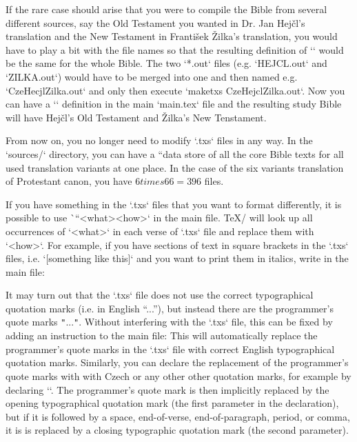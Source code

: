 {If the rare case should arise that you were to compile the Bible from several different sources, say the Old Testament you wanted in Dr. Jan Hejčl's translation and the New Testament in František Žilka's translation, you would have to play a bit with the file names so that the resulting definition of `\tmark` would be the same for the whole Bible. The two `*.out` files (e.g. `HEJCL.out` and `ZILKA.out`) would have to be merged into one and then named e.g. `CzeHecjlZilka.out` and  only then execute `maketxs CzeHejclZilka.out`.  Now you can have a `\def\tmark{HejclZilka}` definition in the main `main.tex` file and 
the resulting study Bible will have Hejčl's Old Testament and Žilka's New Tenstament.




From now on, you no longer need to modify  `.txs` files in any way.
In the `sources/` directory, you can have a “data store of all the core Bible texts for all used translation variants at one place. In the case of the six variants
translation of Protestant canon, you have $6 times 66=396$ files.



If you have something in the `.txs` files that you want to format differently, it is 
possible to use \`\cnvtext``{<what>}{<how>}` in the main file. 
\TeX/  will look up all occurrences of `<what>` in each verse of `.txs` file and replace them with `<how>`.
For example, if you have sections of text in square brackets in the `.txs` files, i.e.
`[something like this]` and you want to print them in italics, write in the main file:
\begtt
\cnvtext{[}{\bgroup\it} \cnvtext{]}{\/\egroup}
\endtt

It may turn out that the `.txs` file does not use the correct typographical quotation marks (i.e. in English “...”), but instead there are the programmer's quote marks {\tt"}...{\tt"}. 
Without interfering with the `.txs` file, this can be fixed by adding an instruction to
the main file:
\begtt
{}
\endtt
This will automatically replace the programmer's quote marks in the `.txs` file with correct English  typographical quotation marks. 
Similarly, you can declare the replacement of the programmer's quote marks with 
with Czech or any other other quotation marks, for example by declaring
``.
The programmer's quote mark is then implicitly
replaced by the opening typographical quotation mark (the first parameter in the 
declaration), but if it is followed by a space, end-of-verse, end-of-paragraph, period, 
or comma, it is is replaced by a closing typographic quotation mark (the second 
parameter).

}
